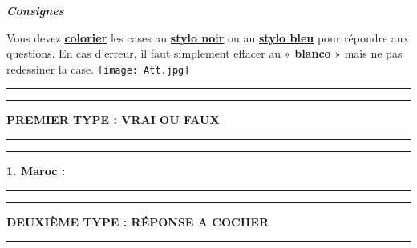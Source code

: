 \documentclass[a4paper,10]{article}
\begin{document}
{{}


%
\begin{center}\em
\begin{center} \large \bf \emph{Consignes} \end{center}
\begin{center} 
Vous devez   \textbf{ \underline{colorier}} les cases au \textbf{\underline{stylo noir}} ou au \textbf{\underline{stylo bleu}} pour répondre aux questions. 
En cas d'erreur, il faut simplement effacer au « \textbf{blanco} » mais ne pas redessiner la case. \texttt{[image: Att.jpg]}
\end{center}
\end{center}

\hrule\vspace{0.2ex}



\begin{center}
      \hrule\vspace{2mm}
	  \bf\Large \textsf{PREMIER TYPE : VRAI OU FAUX}
      \vspace{1mm}\hrule
\end{center}
\begin{flushleft}\hrule\vspace{2mm}\bf 1. Maroc :\vspace{1mm}\hrule\end{flushleft}

\begin{center}
      \hrule\vspace{2mm}
	  \bf\Large \textsf{DEUXIÈME TYPE : RÉPONSE A COCHER}
      \vspace{1mm}\hrule
\end{center}
\begin{multicols}{2} \columnseprule=1.0pt
\end{multicols} 


}
\end{document}
